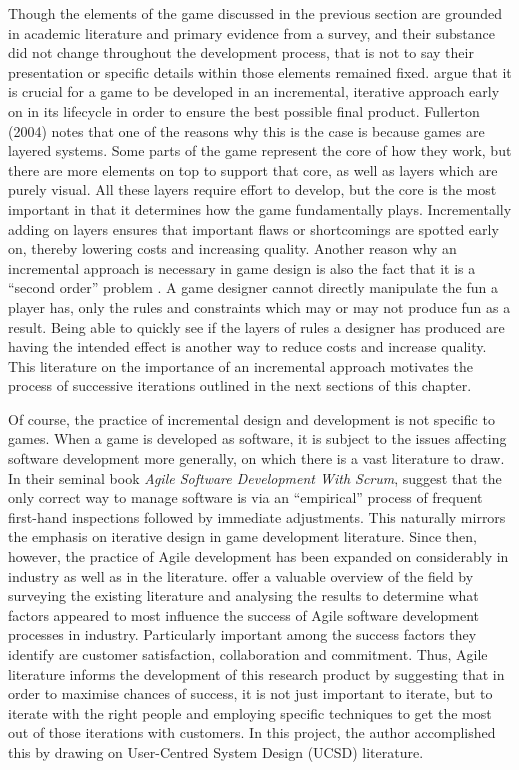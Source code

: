 \documentclass{l4proj}
\begin{document}
Though the elements of the game discussed in the previous section are grounded in academic literature and primary evidence from a survey, and their substance did not change throughout the development process, that is not to say their presentation or specific details within those elements remained fixed. \citet{salen2004rules} argue that it is crucial for a game to be developed in an incremental, iterative approach early on in its lifecycle in order to ensure the best possible final product. Fullerton (2004) notes that one of the reasons why this is the case is because games are layered systems. Some parts of the game represent the core of how they work, but there are more elements on top to support that core, as well as layers which are purely visual. All these layers require effort to develop, but the core is the most important in that it determines how the game fundamentally plays. Incrementally adding on layers ensures that important flaws or shortcomings are spotted early on, thereby lowering costs and increasing quality. Another reason why an incremental approach is necessary in game design is also the fact that it is a “second order” problem \citep{salen2004rules}. A game designer cannot directly manipulate the fun a player has, only the rules and constraints which may or may not produce fun as a result. Being able to quickly see if the layers of rules a designer has produced are having the intended effect is another way to reduce costs and increase quality. This literature on the importance of an incremental approach motivates the process of successive iterations outlined in the next sections of this chapter.

Of course, the practice of incremental design and development is not specific to games. When a game is developed as software, it is subject to the issues affecting software development more generally, on which there is a vast literature to draw. In their seminal book \emph{Agile Software Development With Scrum}, \citet{schwaber2002agile} suggest that the only correct way to manage software is via an “empirical” process of frequent first-hand inspections followed by immediate adjustments. This naturally mirrors the emphasis on iterative design in game development literature. Since then, however, the practice of Agile development has been expanded on considerably in industry as well as in the literature. \citet{misra2009identifying} offer a valuable overview of the field by surveying the existing literature and analysing the results to determine what factors appeared to most influence the success of Agile software development processes in industry. Particularly important among the success factors they identify are customer satisfaction, collaboration and commitment. Thus, Agile literature informs the development of this research product by suggesting that in order to maximise chances of success, it is not just important to iterate, but to iterate with the right people and employing specific techniques to get the most out of those iterations with customers. In this project, the author accomplished this by drawing on User-Centred System Design (UCSD) literature.
\end{document}
